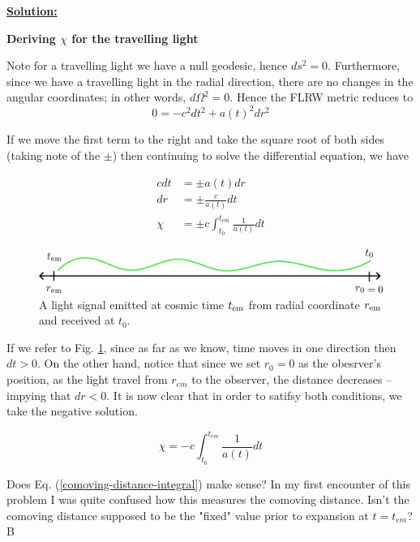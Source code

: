 \documentclass[a4paper,11pt]{article}
\begin{document}
\underline{\textbf{Solution:}}

\vspace{1em}

\textbf{Deriving $\chi$ for the travelling light}

Note for a travelling light we have a null geodesic, hence $ds^2=0$. 
Furthermore, since we have a travelling light in the radial direction,
there are no changes in the angular coordinates; in other words, $d\Omega^2 = 0$. 
Hence the FLRW metric reduces to
\begin{equation}
    0 = -c^2 dt^2 + a(t)^2 dr^2
    \label{null-geodesic-flrw}
\end{equation}

If we move the first term to the right and take the square root of both sides (taking note of the $\pm$)
then continuing to solve the differential equation, we have

\begin{align}
     cdt &= \pm a(t) dr\\
     dr &= \pm \frac{c}{a(t)} dt\\
     \chi &= \pm c \int_{t_0}^{t_{em}} \frac{1}{a(t)} dt
\end{align}

\begin{figure}[H]
\centering
\def\imgwidth{0.65\linewidth}
\includegraphics[width=\imgwidth]{pasted-images/comovinglight.png}
\caption{A light signal emitted at cosmic time $t_{\rm em}$ from radial coordinate $r_{\rm em}$ and received at $t_0$.}
\label{fig:comovinglight}
\end{figure}


If we refer to Fig. \ref{fig:comovinglight}, since as far as we know, time moves in one direction
then $dt>0$. On the other hand, notice that since we set $r_0=0$ as the obesrver's position,
as the light travel from $r_{em}$ to the observer, the distance decreases -- impying that $dr<0$.
It is now clear that in order to satifsy both conditions, we take the negative solution.

\begin{equation}
    \chi = -c \int_{t_0}^{t_{em}} \frac{1}{a(t)} dt
    \label{comoving-distance-integral}
\end{equation}

Does Eq. (\ref{comoving-distance-integral}) make sense? In my first encounter of this problem I was 
quite confused how this measures the comoving distance. Isn't the comoving distance supposed to be 
the "fixed" value prior to expansion at $t=t_{em}$? B
\end{document}
